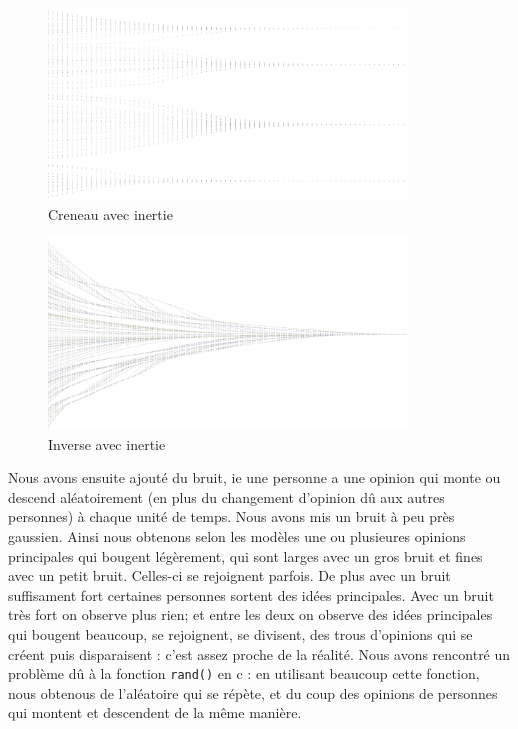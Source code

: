\documentclass[a4paper,10pt]{article}
\begin{document}
\begin{figure}[H]
\begin{center}
\includegraphics[width=270pt]{resultatCreneauInertie_inverse.png}
\end{center}
\caption{Creneau avec inertie}
\label{sim_creneau_inertie}
\end{figure}

\begin{figure}[H]
\begin{center}
\includegraphics[width=270pt]{resultatInverseInertie_inverse.png}
\end{center}
\caption{Inverse avec inertie}
\label{sim_inverse_inertie}
\end{figure}

Nous avons ensuite ajouté du bruit, ie une personne a une opinion qui monte ou descend aléatoirement (en plus du changement d'opinion dû aux autres personnes) à chaque unité de temps. Nous avons mis un bruit à peu près gaussien. Ainsi nous obtenons selon les modèles une ou plusieures opinions principales qui bougent légèrement, qui sont larges avec un gros bruit et fines avec un petit bruit. Celles-ci se rejoignent parfois. De plus avec un bruit suffisament fort certaines personnes sortent des idées principales. Avec un bruit très fort on observe plus rien; et entre les deux on observe des idées principales qui bougent beaucoup, se rejoignent, se divisent, des trous d'opinions qui se créent puis disparaisent : c'est assez proche de la réalité.
Nous avons rencontré un problème dû à la fonction \texttt{rand()} en c : en utilisant beaucoup cette fonction, nous obtenous de l'aléatoire qui se répète, et du coup des opinions de personnes qui montent et descendent de la même manière.
\end{document}
